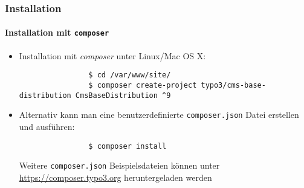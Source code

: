 \begin{frame}[fragile]
	\frametitle{Installation}
	\framesubtitle{Installation mit \texttt{composer}}

	\lstset{basicstyle=\tiny\ttfamily}

	\begin{itemize}
		\item Installation mit \textit{composer} unter Linux/Mac OS X:

			\begin{lstlisting}
				$ cd /var/www/site/
				$ composer create-project typo3/cms-base-distribution CmsBaseDistribution ^9
			\end{lstlisting}

		\item Alternativ kann man eine benutzerdefinierte \texttt{composer.json} Datei erstellen und ausführen:

			\begin{lstlisting}
				$ composer install
			\end{lstlisting}

			Weitere \texttt{composer.json} Beispielsdateien können unter \href{https://composer.typo3.org}{https://composer.typo3.org} heruntergeladen werden
			\normalsize

	\end{itemize}
\end{frame}

